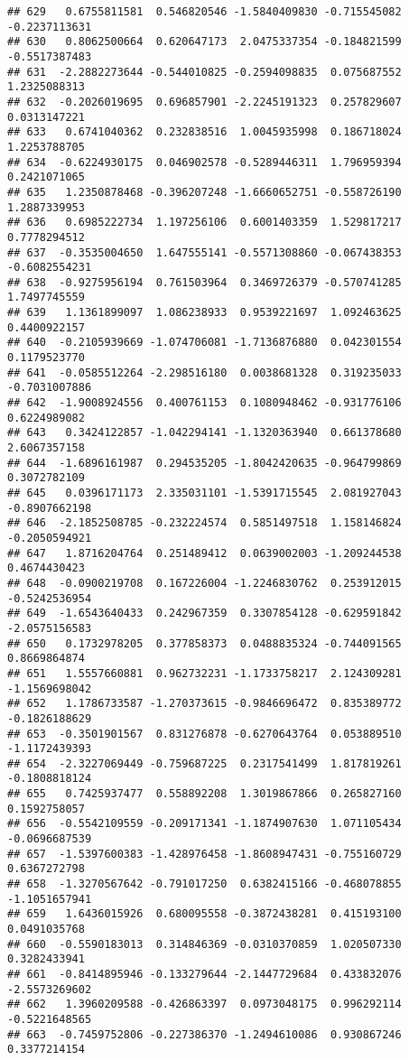 \documentclass[
]{article}
\begin{document}
\begin{verbatim}
## 629   0.6755811581  0.546820546 -1.5840409830 -0.715545082 -0.2237113631
## 630   0.8062500664  0.620647173  2.0475337354 -0.184821599 -0.5517387483
## 631  -2.2882273644 -0.544010825 -0.2594098835  0.075687552  1.2325088313
## 632  -0.2026019695  0.696857901 -2.2245191323  0.257829607  0.0313147221
## 633   0.6741040362  0.232838516  1.0045935998  0.186718024  1.2253788705
## 634  -0.6224930175  0.046902578 -0.5289446311  1.796959394  0.2421071065
## 635   1.2350878468 -0.396207248 -1.6660652751 -0.558726190  1.2887339953
## 636   0.6985222734  1.197256106  0.6001403359  1.529817217  0.7778294512
## 637  -0.3535004650  1.647555141 -0.5571308860 -0.067438353 -0.6082554231
## 638  -0.9275956194  0.761503964  0.3469726379 -0.570741285  1.7497745559
## 639   1.1361899097  1.086238933  0.9539221697  1.092463625  0.4400922157
## 640  -0.2105939669 -1.074706081 -1.7136876880  0.042301554  0.1179523770
## 641  -0.0585512264 -2.298516180  0.0038681328  0.319235033 -0.7031007886
## 642  -1.9008924556  0.400761153  0.1080948462 -0.931776106  0.6224989082
## 643   0.3424122857 -1.042294141 -1.1320363940  0.661378680  2.6067357158
## 644  -1.6896161987  0.294535205 -1.8042420635 -0.964799869  0.3072782109
## 645   0.0396171173  2.335031101 -1.5391715545  2.081927043 -0.8907662198
## 646  -2.1852508785 -0.232224574  0.5851497518  1.158146824 -0.2050594921
## 647   1.8716204764  0.251489412  0.0639002003 -1.209244538  0.4674430423
## 648  -0.0900219708  0.167226004 -1.2246830762  0.253912015 -0.5242536954
## 649  -1.6543640433  0.242967359  0.3307854128 -0.629591842 -2.0575156583
## 650   0.1732978205  0.377858373  0.0488835324 -0.744091565  0.8669864874
## 651   1.5557660881  0.962732231 -1.1733758217  2.124309281 -1.1569698042
## 652   1.1786733587 -1.270373615 -0.9846696472  0.835389772 -0.1826188629
## 653  -0.3501901567  0.831276878 -0.6270643764  0.053889510 -1.1172439393
## 654  -2.3227069449 -0.759687225  0.2317541499  1.817819261 -0.1808818124
## 655   0.7425937477  0.558892208  1.3019867866  0.265827160  0.1592758057
## 656  -0.5542109559 -0.209171341 -1.1874907630  1.071105434 -0.0696687539
## 657  -1.5397600383 -1.428976458 -1.8608947431 -0.755160729  0.6367272798
## 658  -1.3270567642 -0.791017250  0.6382415166 -0.468078855 -1.1051657941
## 659   1.6436015926  0.680095558 -0.3872438281  0.415193100  0.0491035768
## 660  -0.5590183013  0.314846369 -0.0310370859  1.020507330  0.3282433941
## 661  -0.8414895946 -0.133279644 -2.1447729684  0.433832076 -2.5573269602
## 662   1.3960209588 -0.426863397  0.0973048175  0.996292114 -0.5221648565
## 663  -0.7459752806 -0.227386370 -1.2494610086  0.930867246  0.3377214154

\end{verbatim}
\end{document}
